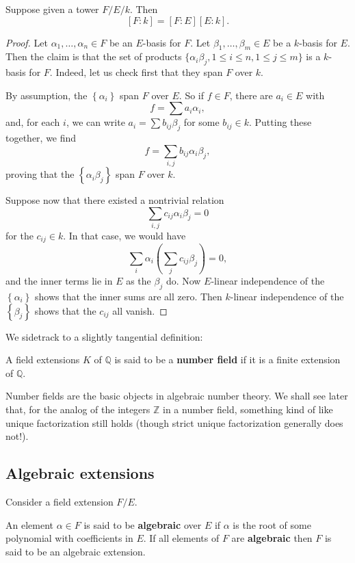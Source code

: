 \begin{proposition}[Multiplicativity]
Suppose given a tower $F/E/k$. Then
\[ [F:k] = [F:E][E:k].  \]
\end{proposition} 
\begin{proof} 
Let $\alpha_1, \dots, \alpha_n \in F$ be an $E$-basis for $F$. Let $\beta_1,
\dots, \beta_m \in E$ be a $k$-basis for $E$. Then the claim is that
the set of products $\{\alpha_i \beta_j, 1 \leq i \leq n, 1 \leq j \leq m\}$ is a $k$-basis for $F$. 
Indeed, let us check first that they span $F$ over $k$.

By assumption, the $\left\{\alpha_i\right\}$ span $F$ over $E$. So if $f \in
F$, there are $a_i \in E$ with 
\[ f = \sum a_i\alpha_i,  \]
and, for each $i$, we can write $a_i = \sum b_{ij} \beta_j$ for some $b_{ij} \in k$. Putting
these together, we find
\[ f = \sum_{i,j} b_{ij}\alpha_i \beta_j,  \]
proving that the $\left\{\alpha_i \beta_j\right\}$ span $F$ over $k$.

Suppose now that there existed a nontrivial relation
\[ \sum_{i,j} c_{ij} \alpha_i \beta_j =0 \]
for the $c_{ij} \in k$. In that case, we would have
\[ \sum_i \alpha_i \left( \sum_j c_{ij} \beta_j \right) =0, \]
and the inner terms lie in $E$ as the $\beta_j$ do. Now $E$-linear independence of
the $\left\{\alpha_i\right\}$ shows that the inner sums are all zero. Then
$k$-linear independence of the $\left\{\beta_j\right\}$ shows that the
$c_{ij}$ all vanish.
\end{proof} 

We sidetrack to a slightly tangential definition:
\begin{definition} 
 A field extensions $K$ of $\mathbb{Q}$ is said to be a \textbf{number field}
if it is a finite extension of $\mathbb{Q}$.
\end{definition} 
Number fields are the basic objects in algebraic number theory. We shall see
later that,
for the analog of the integers $\mathbb{Z}$ in a number field, something kind
of like unique factorization still holds (though strict unique factorization
generally does not!).

\subsection{Algebraic extensions}

Consider a field extension $F/E$.

\begin{definition}
An element $\alpha\in F$ is said to be \textbf{algebraic} over $E$ if
$\alpha$ is the root of some polynomial with coefficients in $E$. If all
elements of $F$ are \textbf{algebraic} then $F$ is said to be an algebraic extension. 
\end{definition}

